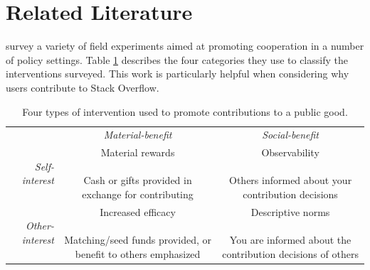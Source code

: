 \documentclass[conference]{IEEEtran}
\newcommand{\1}{\mathds{1}}
\newcommand{\myrotate}[1]{#1}
\newcommand{\PreserveBackslash}[1]{\let\temp=\\#1\let\\=\temp}
\newcommand{\mycell}[1]{\parbox[m]{1.1in}{\PreserveBackslash\raggedright \vspace{7pt} #1 \vspace{7pt}}}
\begin{document}
\section{Related Literature}

\citet{Kraft-Todd} survey a variety of field experiments aimed at
promoting cooperation in a number of policy settings. Table
\ref{tab:kraft-todd} describes the four categories they use to
classify the interventions surveyed. This work is particularly helpful
when considering why users contribute to Stack Overflow.

\begin{table}[h!tbp]
  \renewcommand{\arraystretch}{2}
  \caption{Four types of intervention used to promote contributions to a public good.}
  \label{tab:kraft-todd}
  \begin{tabular}{r|c|c|}

    \multicolumn{1}{c}{} & \multicolumn{1}{c}{\textit{Material-benefit}} & \multicolumn{1}{c}{\textit{Social-benefit}} \\
    \cline{2-3}

    \myrotate{\textit{Self-interest}} & \mycell{ Material rewards \\ \\ Cash or gifts provided in exchange for contributing } & \mycell{Observability \\ \\ Others informed about your contribution decisions} \\


    \myrotate{\textit{Other-interest}} & \mycell{ Increased efficacy \\ \\ Matching/seed funds provided, or benefit to others emphasized } & \mycell{Descriptive norms \\ \\ You are informed about the contribution decisions of others} \\

  \end{tabular}
\end{table}
\end{document}
